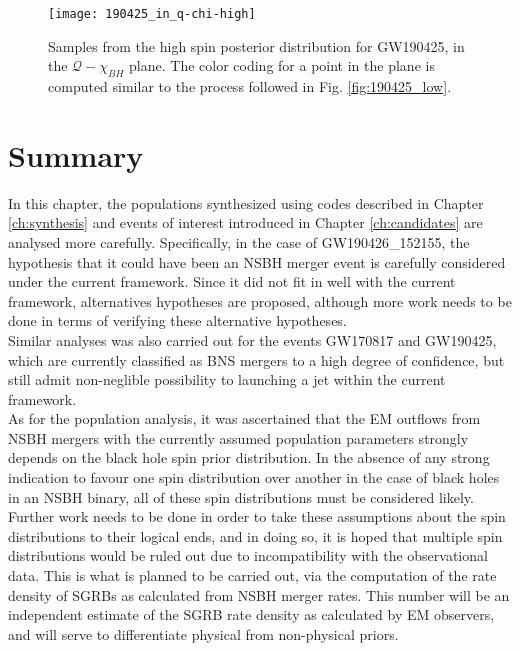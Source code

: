         \begin{figure}[ht]
            \centering
            \texttt{[image: 190425\_in\_q-chi-high]}
            \caption[$M_{disc}$ for GW190425's High Spin Posterior Distribution]
            {
                Samples from the high spin posterior distribution for GW190425, in the
                $\mathcal{Q}-\chi_{BH}$ plane.  The color coding for a point in the
                plane is computed similar to the process followed in Fig.
                \ref{fig:190425_low}.
            }
            \label{fig:190425_high}
        \end{figure}

\section{Summary}

    In this chapter, the populations synthesized using codes described in Chapter
    \ref{ch:synthesis} and events of interest introduced in Chapter \ref{ch:candidates}
    are analysed more carefully. Specifically, in the case of GW190426\_152155, the
    hypothesis that it could have been an NSBH merger event is carefully considered
    under the current framework. Since it did not fit in well with the current
    framework, alternatives hypotheses are proposed, although more work needs to be done
    in terms of verifying these alternative hypotheses.\\
    Similar analyses was also carried out for the events GW170817 and GW190425, which
    are currently classified as BNS mergers to a high degree of confidence, but still
    admit non-neglible possibility to launching a jet within the current framework.\\
    As for the population analysis, it was ascertained that the EM outflows from NSBH
    mergers with the currently assumed population parameters strongly depends on the
    black hole spin prior distribution. In the absence of any strong indication to
    favour one spin distribution over another in the case of black holes in an NSBH
    binary, all of these spin distributions must be considered likely. Further work
    needs to be done in order to take these assumptions about the spin distributions to
    their logical ends, and in doing so, it is hoped that multiple spin distributions
    would be ruled out due to incompatibility with the observational data. This is what
    is planned to be carried out, via the computation of the rate density of SGRBs as
    calculated from NSBH merger rates. This number will be an independent estimate of
    the SGRB rate density as calculated by EM observers, and will serve to differentiate
    physical from non-physical priors.
